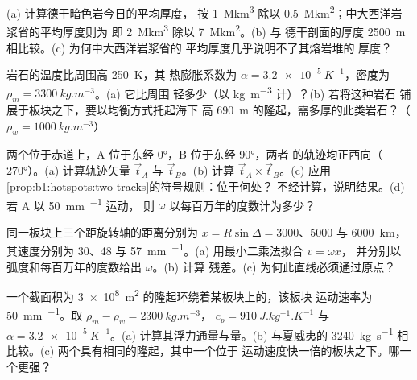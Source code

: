 \begin{exercise}[$\star$]\label{exo:b1:hotspots:3}
(a) 计算德干暗色岩今日的平均厚度，
按 \qty{1}{\mega km^3} 除以 \qty{0.5}{\mega km^2}；中大西洋岩浆省的平均厚度则为
即 \qty{2}{\mega km^3} 除以 \qty{7}{\mega km^2}。(b) 与
德干剖面的厚度 \qty{2500}{m} 相比较。(c) 为何中大西洋岩浆省的
平均厚度几乎说明不了其熔岩堆的
厚度？
\end{exercise}

\begin{exercise}[$\star$]\label{exo:b1:hotspots:4}
岩石的温度比周围高 \qty{250}{K}，其
热膨胀系数为 $\alpha = \qty{3.2e-5}{K^{-1}}$，密度为 $\rho_m = \qty{3300}{kg.m^{-3}}$。(a) 它比周围
轻多少（以 \unit{kg.m^{-3}} 计）？(b) 若将这种岩石
铺展于板块之下，要以均衡方式托起海下
高 \qty{690}{m} 的隆起，需多厚的此类岩石？（$\rho_w = \qty{1000}{kg.m^{-3}}$）
\end{exercise}

\begin{exercise}[$\star\star$]\label{exo:b1:hotspots:5}
两个位于赤道上，A 位于东经 \ang{0}，B 位于东经 \ang{90}，两者
的轨迹均正西向（ \ang{270}）。(a) 计算轨迹矢量
$\vec t_A$ 与 $\vec t_B$。(b) 计算 $\vec t_A\times\vec t_B$。(c) 应用
\cref{prop:b1:hotspots:two-tracks}的符号规则：位于何处？
不经计算，说明结果。(d) 若 A 以 \qty{50}{mm.^{-1}} 运动，
则 $\omega$ 以每百万年的度数计为多少？
\end{exercise}

\begin{exercise}[$\star\star$]\label{exo:b1:hotspots:6}
同一板块上三个距旋转轴的距离分别为 $x = R\sin\Delta = 3000$、5000
与 \qty{6000}{km}，其速度分别为 30、48 与
\qty{57}{mm.^{-1}}。(a) 用最小二乘法拟合 $v = \omega x$，
并分别以弧度和每百万年的度数给出 $\omega$。(b) 计算
残差。(c) 为何此直线必须通过原点？
\end{exercise}

\begin{exercise}[$\star\star$]\label{exo:b1:hotspots:7}
一个截面积为 \qty{3e8}{m^2} 的隆起环绕着某板块上的，该板块
运动速率为 \qty{50}{mm.^{-1}}。取 $\rho_m - \rho_w = \qty{2300}{kg.m^{-3}}$，
$c_p = \qty{910}{J.kg^{-1}.K^{-1}}$ 与 $\alpha = \qty{3.2e-5}{K^{-1}}$。(a)
计算其浮力通量与量。(b) 与夏威夷的
\qty{3240}{kg.s^{-1}} 相比较。(c) 两个具有相同的隆起，其中一个位于
运动速度快一倍的板块之下。哪一个更强？
\end{exercise}


